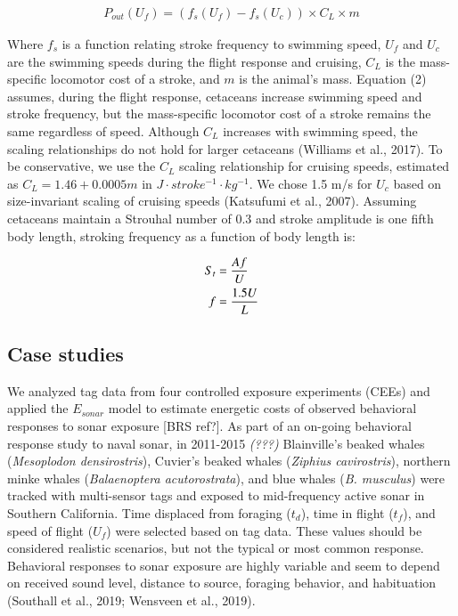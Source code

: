 \documentclass[]{elsarticle} %
\begin{document}
\begin{align}
P_{out}(U_f) = (f_s(U_f) - f_s(U_c)) \times C_L \times m
\end{align}

Where \(f_s\) is a function relating stroke frequency to swimming speed,
\(U_f\) and \(U_c\) are the swimming speeds during the flight response
and cruising, \(C_L\) is the mass-specific locomotor cost of a stroke,
and \(m\) is the animal's mass. Equation (2) assumes, during the flight
response, cetaceans increase swimming speed and stroke frequency, but
the mass-specific locomotor cost of a stroke remains the same regardless
of speed. Although \(C_L\) increases with swimming speed, the scaling
relationships do not hold for larger cetaceans (Williams et al., 2017).
To be conservative, we use the \(C_L\) scaling relationship for cruising
speeds, estimated as \(C_L = 1.46 + 0.0005m\) in
\(J \cdot stroke^{-1} \cdot kg^{-1}\). We chose 1.5 m/s for \(U_c\)
based on size-invariant scaling of cruising speeds (Katsufumi et al.,
2007). Assuming cetaceans maintain a Strouhal number of 0.3 and stroke
amplitude is one fifth body length, stroking frequency as a function of
body length is:

\begin{align}
S_t &= \frac{Af}{U} \notag\\
f &= \frac{1.5U}{L}
\end{align}

\subsection{Case studies}\label{case-studies}

We analyzed tag data from four controlled exposure experiments (CEEs)
and applied the \(E_{sonar}\) model to estimate energetic costs of
observed behavioral responses to sonar exposure {[}BRS ref?{]}. As part
of an on-going behavioral response study to naval sonar, in 2011-2015
\emph{(???)} Blainville's beaked whales (\emph{Mesoplodon
densirostris}), Cuvier's beaked whales (\emph{Ziphius cavirostris}),
northern minke whales (\emph{Balaenoptera acutorostrata}), and blue
whales (\emph{B. musculus}) were tracked with multi-sensor tags and
exposed to mid-frequency active sonar in Southern California. Time
displaced from foraging (\(t_d\)), time in flight (\(t_f\)), and speed
of flight (\(U_f\)) were selected based on tag data. These values should
be considered realistic scenarios, but not the typical or most common
response. Behavioral responses to sonar exposure are highly variable and
seem to depend on received sound level, distance to source, foraging
behavior, and habituation (Southall et al., 2019; Wensveen et al.,
2019).
\end{document}
